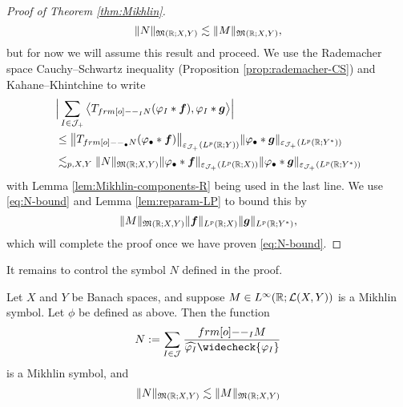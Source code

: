 \begin{proof}[Proof of Theorem \ref{thm:Mikhlin}]
\begin{equation}
  \|N\|_{\mathfrak{M}(\mathbb{R};X,Y)} \lesssim \|M\|_{\mathfrak{M}(\mathbb{R};X,Y)},
\end{equation}
but for now we will assume this result and proceed.
We use the Rademacher space Cauchy--Schwartz inequality (Proposition \ref{prop:rademacher-CS}) and Kahane--Khintchine to write
\begin{equation*}
  \begin{aligned}
    &\Big| \sum_{I \in \mc{J}_{+}} \big\langle T_{\1_{I} N} (\phi_{I} \ast \mb{f}) , \phi_{I} \ast \mb{g} \big\rangle \Big| \\
    &\leq \big\| T_{\1_{\bullet} N} (\phi_{\bullet} \ast \mb{f}) \big\|_{\varepsilon_{\mc{J}_{+}}(L^p(\R;Y))}
    \| \phi_{\bullet} \ast \mb{g} \|_{\varepsilon_{\mc{J}_{+}}(L^p(\R;Y^{*}))} \\
    &\lesssim_{p,X,Y} \|N\|_{\mf{M}(\R;X,Y)} \| \phi_{\bullet} \ast \mb{f} \|_{\varepsilon_{\mc{J}_{+}}(L^p(\R;X))}
    \|\phi_{\bullet} \ast \mb{g} \|_{\varepsilon_{\mc{J}_{+}}(L^p(\R;Y^{*}))} \\
  \end{aligned}
\end{equation*}
with Lemma \ref{lem:Mikhlin-components-R} being used in the last line.
We use \eqref{eq:N-bound} and Lemma \ref{lem:reparam-LP} to bound this by
\begin{equation*}
  \|M\|_{\mathfrak{M}(\mathbb{R};X,Y)} \| \bm{f} \|_{L^p(\mathbb{R};X)} \| \bm{g} \|_{L^p(\mathbb{R};Y^{*})},
\end{equation*}
which will complete the proof once we have proven \eqref{eq:N-bound}.
\end{proof}

It remains to control the symbol $N$ defined in the proof.

\begin{lem}\label{lem:N-symbol}
  Let $X$ and $Y$ be Banach spaces, and suppose $M \in L^\infty(\mathbb{R};\mathcal{L}(X,Y))$ is a Mikhlin symbol.
  Let $\phi$ be defined as above.
  Then the function
  \begin{equation*}
    N := \sum_{I \in \mc{J}} \frac{\1_{I} M}{\widehat{\phi_{I}} \widecheck{\phi_{I}}}
  \end{equation*}
  is a Mikhlin symbol, and
  \begin{equation*}
    \|N\|_{\mathfrak{M}(\mathbb{R};X,Y)} \lesssim \|M\|_{\mathfrak{M}(\mathbb{R};X,Y)}
  \end{equation*}
\end{lem}

